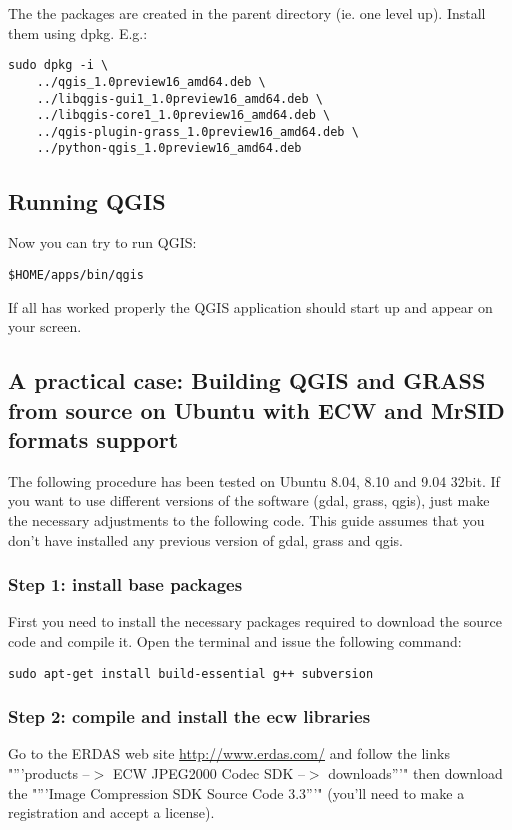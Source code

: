 The the packages are created in the parent directory (ie. one level up).
Install them using dpkg.  E.g.:

\begin{verbatim}
sudo dpkg -i \
	../qgis_1.0preview16_amd64.deb \
	../libqgis-gui1_1.0preview16_amd64.deb \
	../libqgis-core1_1.0preview16_amd64.deb \
	../qgis-plugin-grass_1.0preview16_amd64.deb \
	../python-qgis_1.0preview16_amd64.deb
\end{verbatim}

\subsection{Running QGIS}
Now you can try to run QGIS:

\begin{verbatim}
$HOME/apps/bin/qgis 
\end{verbatim}

If all has worked properly the QGIS application should start up and appear
on your screen.

\subsection{A practical case: Building QGIS and GRASS from source on Ubuntu with ECW and MrSID formats support}
The following procedure has been tested on Ubuntu 8.04, 8.10 and 9.04 32bit. If you want 
to use different versions of the software (gdal, grass, qgis), just make the 
necessary adjustments to the following code. This guide assumes that you don't have 
installed any previous version of gdal, grass and qgis.

\subsubsection{Step 1: install base packages}
First you need to install the necessary packages required to download the source 
code and compile it. Open the terminal and issue the following command:

\begin{verbatim}
sudo apt-get install build-essential g++ subversion
\end{verbatim}

\subsubsection{Step 2: compile and install the ecw libraries}
Go to the ERDAS web site \url{http://www.erdas.com/} and follow the links
"'''products --$>$ ECW JPEG2000 Codec SDK --$>$ downloads'''" 
then download the "'''Image Compression SDK Source Code 3.3'''" (you'll need to make a registration 
and accept a license).

